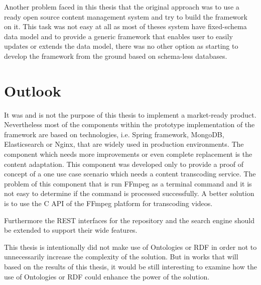 Another problem faced in this thesis that the original approach was to use a ready open source content management system and try to build the framework on it. This task was not easy at all as most of theses system have fixed-schema data model and to provide a generic framework that enables user to easily updates or extends the data model, there was no other option as starting to develop the framework from the ground based on schema-less databases. 

\section{Outlook}
It was and is not the purpose of this thesis to implement a market-ready product. Nevertheless most of the components within the prototype implementation of the framework are based on technologies, i.e. Spring framework, MongoDB, Elasticsearch or Nginx, that are widely used in production environments. The component which needs more improvements or even complete replacement is the content adaptation. This component was developed only to provide a proof of concept of a one use case scenario which needs a content transcoding service. The problem of this component that is run FFmpeg as a terminal command and it is not easy to determine if the command is processed successfully. A better solution is to use the C API of the FFmpeg platform for transcoding videos.

Furthermore the REST interfaces for the repository and the search engine should be extended to support their wide features.

This thesis is intentionally did not make use of Ontologies or RDF in order not to unnecessarily increase the complexity of the solution. But in works that will based on the results of this thesis, it would be still interesting to examine how the use of Ontologies or RDF could enhance the power of the solution.
